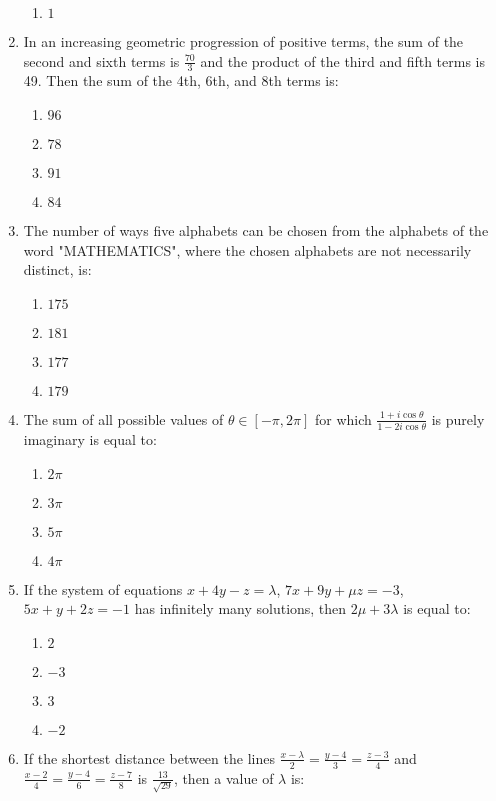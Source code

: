 \documentclass[journal,12pt,onecolumn]{IEEEtran}
\theoremstyle{remark}
\begin{document}
\begin{enumerate}
\begin{enumerate}
        \item $1$
    \end{enumerate}
    \item In an increasing geometric progression of positive terms, the sum of the second and sixth terms is $\frac{70}{3}$ and the product of the third and fifth terms is 49. Then the sum of the 4th, 6th, and 8th terms is:
    \begin{enumerate}
        \item $96$
        \item $78$
        \item $91$
        \item $84$
    \end{enumerate}
    \item The number of ways five alphabets can be chosen from the alphabets of the word "MATHEMATICS", where the chosen alphabets are not necessarily distinct, is:
    \begin{enumerate}
        \item $175$
        \item $181$
        \item $177$
        \item $179$
    \end{enumerate}
    \item The sum of all possible values of $\theta \in [-\pi, 2\pi]$ for which $\frac{1 + i\cos \theta}{1 - 2i\cos \theta}$ is purely imaginary is equal to:
    \begin{enumerate}
        \item $2\pi$
        \item $3\pi$
        \item $5\pi$
        \item $4\pi$
    \end{enumerate}
    \item If the system of equations $x + 4y - z = \lambda$, $7x + 9y + \mu z = -3$, $5x + y + 2z = -1$ has infinitely many solutions, then $2\mu + 3\lambda$ is equal to:
    \begin{enumerate}
        \item $2$
        \item $-3$
        \item $3$
        \item $-2$
    \end{enumerate}
    \item If the shortest distance between the lines $\frac{x - \lambda}{2} = \frac{y - 4}{3} = \frac{z - 3}{4}$ and $\frac{x - 2}{4} = \frac{y - 4}{6} = \frac{z - 7}{8}$ is $\frac{13}{\sqrt{29}}$, then a value of $\lambda$ is:

\end{enumerate}
\end{document}
